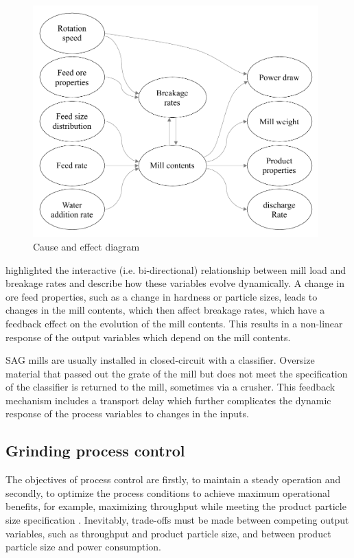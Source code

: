 \begin{figure}[htp]
	\centering
	\includegraphics[width=11cm]{images/cause-effect.pdf}
	\caption{Cause and effect diagram} \label{fig:cause-effect}
\end{figure}

\cite{powell_applying_2009} highlighted the interactive (i.e. bi-directional) relationship between mill load and breakage rates and describe how these variables evolve dynamically. A change in ore feed properties, such as a change in hardness or particle sizes, leads to changes in the mill contents, which then affect breakage rates, which have a feedback effect on the evolution of the mill contents. This results in a non-linear response of the output variables which depend on the mill contents.

SAG mills are usually installed in closed-circuit with a classifier. Oversize material that passed out the grate of the mill but does not meet the specification of the classifier is returned to the mill, sometimes via a crusher. This feedback mechanism includes a transport delay which further complicates the dynamic response of the process variables to changes in the inputs.

\subsection*{Grinding process control}

The objectives of process control are firstly, to maintain a steady operation and secondly, to optimize the process conditions to achieve maximum operational benefits, for example, maximizing throughput while meeting the product particle size specification \citep{wei_grinding_2009}. Inevitably, trade-offs must be made between competing output variables, such as throughput and product particle size, and between product particle size and power consumption.

